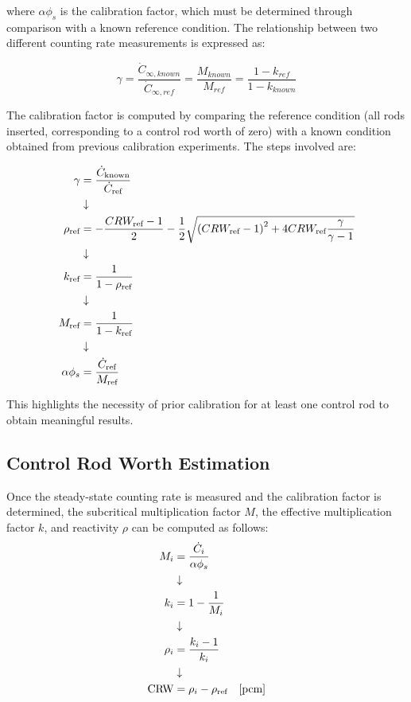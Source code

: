 where $ \alpha \phi_s $ is the calibration factor, which must be determined through comparison with a known reference condition. The relationship between two different counting rate measurements is expressed as:

\begin{equation}
\gamma = \frac{\dot{C}_{\infty,known}}{\dot{C}_{\infty,ref}} = \frac{M_{known}}{M_{ref}} = \frac{1-k_{ref}}{1-k_{known}}
\end{equation}

The calibration factor is computed by comparing the reference condition (all rods inserted, corresponding to a control rod worth of zero) with a known condition obtained from previous calibration experiments. The steps involved are:


\begin{align}
    \gamma &= \frac{\dot{C}_{\text{known}}}{\dot{C}_{\text{ref}}} \notag \\
    & \downarrow  \notag \\
    \rho_{\text{ref}} &= - \frac{CRW_{\text{ref}} - 1}{2} - \frac{1}{2} \sqrt{\left( CRW_{\text{ref}} - 1\right)^2 + 4 CRW_{\text{ref}} \frac{\gamma}{\gamma - 1}} \notag \\
    & \downarrow  \notag \\
    k_{\text{ref}} &= \frac{1}{1 - \rho_{\text{ref}}} \notag \\
    & \downarrow  \notag \\
    M_{\text{ref}} &= \frac{1}{1 - k_{\text{ref}}} \notag \\
    & \downarrow  \notag \\
    \alpha \phi_s &= \frac{\dot{C}_{\text{ref}}}{M_{\text{ref}}}
\end{align}

This highlights the necessity of prior calibration for at least one control rod to obtain meaningful results.

\subsection{Control Rod Worth Estimation}

Once the steady-state counting rate is measured and the calibration factor is determined, the subcritical multiplication factor $ M $, the effective multiplication factor $ k $, and reactivity $ \rho $ can be computed as follows:
\begin{align}
    M_i &= \frac{\dot{C}_i}{\alpha \phi_s} \notag \\
    & \downarrow \notag \\
    k_i &= 1 - \frac{1}{M_i} \notag \\
    & \downarrow \notag \\
    \rho_i &= \frac{k_i - 1}{k_i} \notag \\
    & \downarrow \notag \\
    \text{CRW} &=  \rho_i -\rho_{\text{ref}} \quad [\text{pcm}]
\end{align}

